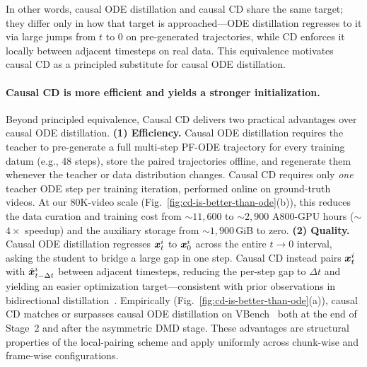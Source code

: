 In other words, causal ODE distillation and causal CD share the same target; they differ only in how that target is approached---ODE distillation regresses to it via large jumps from $t$ to $0$ on pre-generated trajectories, while CD enforces it locally between adjacent timesteps on real data. This equivalence motivates causal CD as a principled substitute for causal ODE distillation.



\paragraph{Causal CD is more efficient and yields a stronger initialization.} Beyond principled equivalence, Causal CD delivers two practical advantages over causal ODE distillation. \textbf{(1) Efficiency.} 
Causal ODE distillation requires the teacher to pre-generate a full multi-step PF-ODE trajectory for every training datum (e.g., 48 steps), store the paired trajectories offline, and regenerate them whenever the teacher or data distribution changes. Causal CD requires only \emph{one} teacher ODE step per training iteration, performed online on ground-truth videos. At our 80K-video scale (Fig.~\ref{fig:cd-is-better-than-ode}(b)), this reduces the data curation and training cost from $\sim$$11{,}600$ to $\sim$$2{,}900$ A800-GPU hours ($\sim$$4\times$ speedup) and the auxiliary storage from $\sim$$1{,}900$\,GiB to zero. \textbf{(2) Quality.} Causal ODE distillation regresses ${\bm{x}}_t^i$ to ${\bm{x}}_0^i$ across the entire $t \to 0$ interval, asking the student to bridge a large gap in one step. Causal CD instead pairs ${\bm{x}}_t^i$ with $\hat{{\bm{x}}}^i_{t-\Delta t}$ between adjacent timesteps, reducing the per-step gap to $\Delta t$ and yielding an easier optimization target---consistent with prior observations in bidirectional distillation~\cite{liu2023instaflow}. Empirically (Fig.~\ref{fig:cd-is-better-than-ode}(a)), causal CD matches or surpasses causal ODE distillation on VBench~\cite{huang2024vbench} both at the end of Stage~2 and after the asymmetric DMD stage. These advantages are structural properties of the local-pairing scheme and apply uniformly across chunk-wise and frame-wise configurations.

